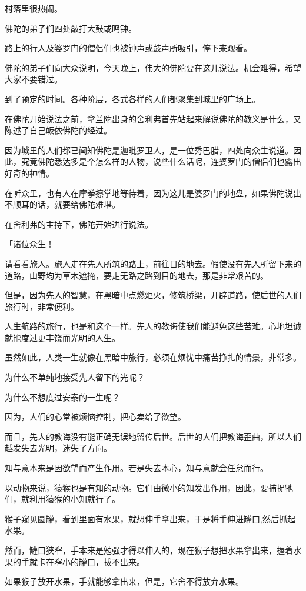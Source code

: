 \documentclass[twoside,openany]{book}
\begin{document}
村落里很热闹。

佛陀的弟子们四处敲打大鼓或鸣钟。

路上的行人及婆罗门的僧侣们也被钟声或鼓声所吸引，停下来观看。

佛陀的弟子们向大众说明，今天晚上，伟大的佛陀要在这儿说法。机会难得，希望大家不要错过。

到了预定的时间。各种阶层，各式各样的人们都聚集到城里的广场上。

在佛陀开始说法之前，拿兰陀出身的舍利弗首先站起来解说佛陀的教义是什么，又陈述了自己皈依佛陀的经过。

因为城里的人们都已闻知佛陀是迦毗罗卫人，是一位秀巴腊，四处向众生说道。因此，究竟佛陀悉达多是个怎么样的人物，说些什么话呢，连婆罗门的僧侣们也露出好奇的神情。

在听众里，也有人在摩拳擦掌地等待着，因为这儿是婆罗门的地盘，如果佛陀说出不顺耳的话，就要给佛陀难堪。

在舍利弗的主持下，佛陀开始进行说法。

「诸位众生！

请看看旅人。旅人走在先人所筑的路上，前往目的地去。假使没有先人所留下来的道路，山野均为草木遮掩，要走无路之路到目的地去，那是非常艰苦的。

但是，因为先人的智慧，在黑暗中点燃炬火，修筑桥梁，开辟道路，使后世的人们旅行时，非常便利。

人生航路的旅行，也是和这个一样。先人的教诲使我们能避免这些苦难。心地坦诚就能度过更丰饶而光明的人生。

虽然如此，人类一生就像在黑暗中旅行，必须在烦忧中痛苦挣扎的情景，非常多。

为什么不单纯地接受先人留下的光呢？

为什么不想度过安泰的一生呢？

因为，人们的心常被烦恼控制，把心卖给了欲望。

而且，先人的教诲没有能正确无误地留传后世。后世的人们把教诲歪曲，所以人们越发失去光明，迷失了方向。

知与意本来是因欲望而产生作用。若是失去本心，知与意就会任怠而行。

以动物来说，猿猴也是有知的动物。它们由微小的知发出作用，因此，要捕捉牠们，就利用猿猴的小知就行了。

猴子窥见圆罐，看到里面有水果，就想伸手拿出来，于是将手伸进罐口,然后抓起水果。

然而，罐口狭窄，手本来是勉强才得以伸入的，现在猴子想把水果拿出来，握着水果的手就卡在窄小的罐口，拔不出来。

如果猴子放开水果，手就能够拿出来，但是，它舍不得放弃水果。
\end{document}

